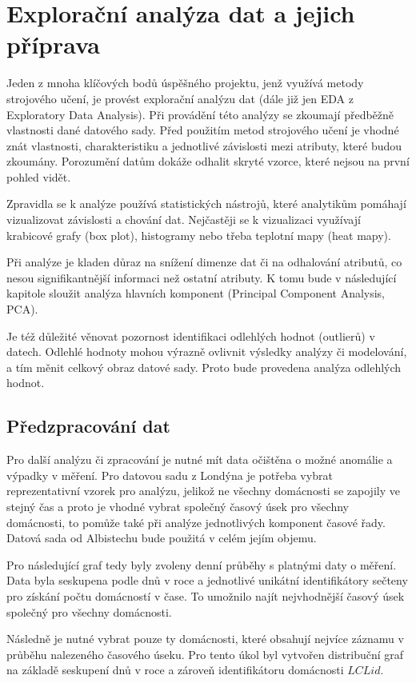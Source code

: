 \documentclass[FM,BP,fonts]{tulthesis}
\begin{document}
\section{Explorační analýza dat a jejich příprava}
Jeden z mnoha klíčových bodů úspěšného projektu, jenž využívá metody strojového učení, je provést explorační analýzu dat (dále již jen EDA z Exploratory Data Analysis). Při provádění této analýzy se zkoumají předběžně vlastnosti dané datového sady. Před použitím metod strojového učení je vhodné znát vlastnosti, charakteristiku a jednotlivé závislosti mezi atributy, které budou zkoumány. Porozumění datům dokáže odhalit skryté vzorce, které nejsou na první pohled vidět.

Zpravidla se k analýze používá statistických nástrojů, které analytikům pomáhají vizualizovat závislosti a chování dat. Nejčastěji se k vizualizaci využívají krabicové grafy (box plot), histogramy nebo třeba teplotní mapy (heat mapy). 

Při analýze je kladen důraz na snížení dimenze dat či na odhalování atributů, co nesou signifikantnější informaci než ostatní atributy. K tomu bude v následující kapitole sloužit analýza hlavních komponent (Principal Component Analysis, PCA). 

Je též důležité věnovat pozornost identifikaci odlehlých hodnot (outlierů) v datech. Odlehlé hodnoty mohou výrazně ovlivnit výsledky analýzy či modelování, a tím měnit celkový obraz datové sady. Proto bude provedena analýza odlehlých hodnot.


\subsection{Předzpracování dat}
Pro další analýzu či zpracování je nutné mít data očištěna o možné anomálie a výpadky v měření. Pro datovou sadu z Londýna je potřeba vybrat reprezentativní vzorek pro analýzu, jelikož ne všechny domácnosti se zapojily ve stejný čas a proto je vhodné vybrat společný časový úsek pro všechny domácnosti, to pomůže také při analýze jednotlivých komponent časové řady. Datová sada od Albistechu bude použitá v celém jejím objemu. 

Pro následující graf tedy byly zvoleny denní průběhy s platnými daty o měření. Data byla seskupena podle dnů v roce a jednotlivé unikátní identifikátory sečteny pro získání počtu domácností v čase. To umožnilo najít nejvhodnější časový úsek společný pro všechny domácnosti.

Následně je nutné vybrat pouze ty domácnosti, které obsahují nejvíce záznamu v průběhu nalezeného časového úseku. Pro tento úkol byl vytvořen distribuční graf na základě seskupení dnů v roce a zároveň identifikátoru domácnosti $LCLid$. 
\end{document}
